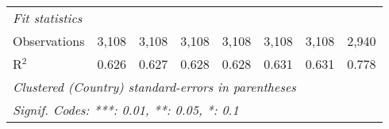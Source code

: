 \begin{tabular}{lccccccc}
   \midrule \emph{Fit statistics}\\
   Observations                                                             & 3,108          & 3,108          & 3,108          & 3,108         & 3,108         & 3,108         & 2,940\\  
   R$^2$                                                                    & 0.626          & 0.627          & 0.628          & 0.628         & 0.631         & 0.631         & 0.778\\  
   \midrule
   \multicolumn{8}{l}{\emph{Clustered (Country) standard-errors in parentheses}}\\
   \multicolumn{8}{l}{\emph{Signif. Codes: ***: 0.01, **: 0.05, *: 0.1}}\\
\end{tabular}
\par\endgroup



